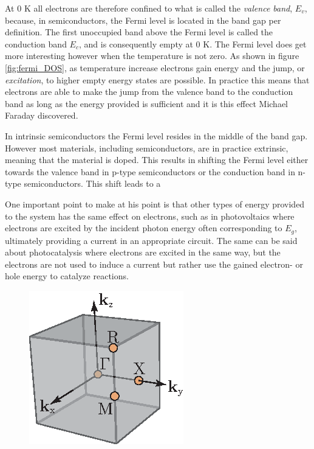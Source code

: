 {At 0 K all electrons are therefore confined to what is called the \textit{valence band}, $E_v$, because, in semiconductors, the Fermi level is located in the band gap per definition. The first unoccupied band above the Fermi level is called the conduction band $E_c$, and is consequently empty at 0 K. The Fermi level does get more interesting however when the temperature is not zero. As shown in figure \ref{fig:fermi_DOS}, as temperature increase electrons gain energy and the jump, or \textit{excitation},  to higher empty energy states are possible. In practice this means that electrons are able to make the jump from the valence band to the conduction band as long as the energy provided is sufficient and it is this effect Michael Faraday discovered.

In intrinsic semiconductors the Fermi level resides in the middle of the band gap. However most materials, including semiconductors, are in practice extrinsic, meaning that the material is doped. This results in shifting the Fermi level either towards the valence band in p-type semiconductors or the conduction band in n-type semiconductors. This shift leads to a 

One important point to make at his point is that other types of energy provided to the system has the same effect on electrons, such as in photovoltaics where electrons are excited by the incident photon energy often corresponding to $E_g$, ultimately providing a current in an appropriate circuit. The same can be said about photocatalysis where electrons are excited in the same way, but the electrons are not used to induce a current but rather use the gained electron- or hole energy to catalyze reactions.



\begin{figure}[ht!]
\centering
\includegraphics[scale=1]{Figures/1stBZ_cu2o.eps}
\end{figure}

}
